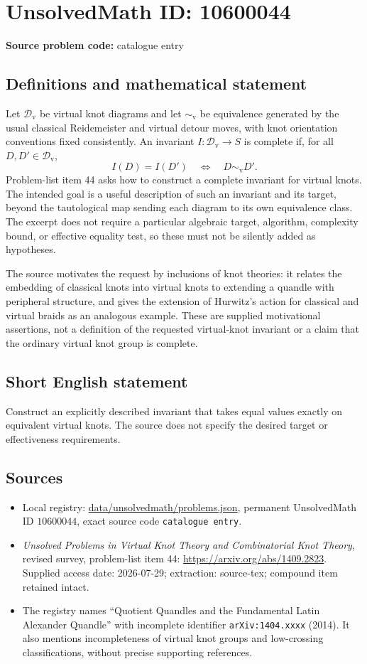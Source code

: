 \documentclass[11pt]{article}
\begin{document}
\section*{UnsolvedMath ID: 10600044}
\textbf{Source problem code:} catalogue entry
\subsection{Definitions and mathematical statement}
Let $\mathcal D_{\mathrm v}$ be virtual knot diagrams and let $\sim_{\mathrm v}$ be equivalence generated by the usual classical Reidemeister and virtual detour moves, with knot orientation conventions fixed consistently. An invariant $I:\mathcal D_{\mathrm v}\to S$ is complete if, for all $D,D'\in\mathcal D_{\mathrm v}$,
\[
 I(D)=I(D')\quad\Longleftrightarrow\quad D\sim_{\mathrm v}D'.
\]
Problem-list item 44 asks how to construct a complete invariant for virtual knots. The intended goal is a useful description of such an invariant and its target, beyond the tautological map sending each diagram to its own equivalence class. The excerpt does not require a particular algebraic target, algorithm, complexity bound, or effective equality test, so these must not be silently added as hypotheses.

The source motivates the request by inclusions of knot theories: it relates the embedding of classical knots into virtual knots to extending a quandle with peripheral structure, and gives the extension of Hurwitz's action for classical and virtual braids as an analogous example. These are supplied motivational assertions, not a definition of the requested virtual-knot invariant or a claim that the ordinary virtual knot group is complete.
\subsection{Short English statement}
Construct an explicitly described invariant that takes equal values exactly on equivalent virtual knots. The source does not specify the desired target or effectiveness requirements.
\subsection{Sources}
\begin{itemize}
\item Local registry: \url{data/unsolvedmath/problems.json}, permanent UnsolvedMath ID $10600044$, exact source code \texttt{catalogue entry}.
\item \emph{Unsolved Problems in Virtual Knot Theory and Combinatorial Knot Theory}, revised survey, problem-list item 44: \url{https://arxiv.org/abs/1409.2823}. Supplied access date: 2026-07-29; extraction: source-tex; compound item retained intact.
\item The registry names ``Quotient Quandles and the Fundamental Latin Alexander Quandle'' with incomplete identifier \texttt{arXiv:1404.xxxx} (2014). It also mentions incompleteness of virtual knot groups and low-crossing classifications, without precise supporting references.
\end{itemize}
\end{document}
